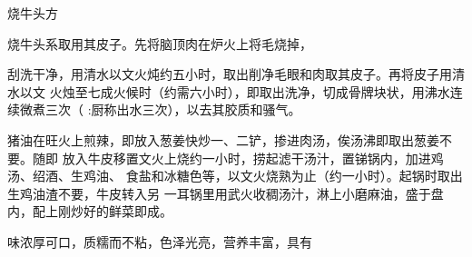 \begin{recipe}{烧牛头方}

\ingredients


\cooking

烧牛头系取用其皮子。先将脑顶肉在炉火上将毛烧掉，

刮洗干净，用清水以文火炖约五小时，取出削净毛眼和肉取其皮子。再将皮子用清水以文
火烛至七成火候时（约需六小时），即取出洗净，切成骨牌块状，用沸水连续微煮三次（
:厨称出水三次），以去其胶质和骚气。

猪油在旺火上煎辣，即放入葱姜快炒一、二铲，掺进肉汤，俟汤沸即取出葱姜不要。随即
放入牛皮移置文火上烧约一小时，捞起滤干汤汁，置锑锅内，加进鸡汤、绍酒、生鸡油、
食盐和冰糖色等，以文火烧熟为止（约一小时）。起锅时取出生鸡油渣不要，牛皮转入另
一耳锅里用武火收稠汤汁，淋上小磨麻油，盛于盘内，配上刚炒好的鲜菜即成。

\features

味浓厚可口，质糯而不粘，色泽光亮，营养丰富，具有

\end{recipe}

